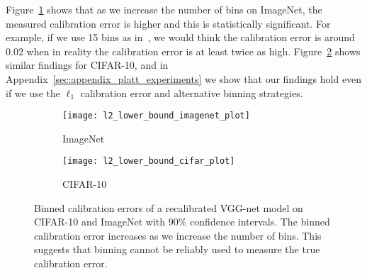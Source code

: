 Figure~\ref{fig:imagenet_lower_bound} shows that as we increase the number of bins on ImageNet, the measured calibration error is higher and this is statistically significant. For example, if we use 15 bins as in~\cite{guo2017calibration}, we would think the calibration error is around 0.02 when in reality the calibration error is at least twice as high. Figure~\ref{fig:cifar_10_lower_bound} shows similar findings for CIFAR-10, and in Appendix~\ref{sec:appendix_platt_experiments} we show that our findings hold even if we use the $\ell_1$ calibration error and alternative binning strategies.

\begin{figure}
     \centering
     \begin{subfigure}[b]{0.4\textwidth}
         \centering
         \texttt{[image: l2\_lower\_bound\_imagenet\_plot]}
         \caption{ImageNet}
         \label{fig:imagenet_lower_bound}
     \end{subfigure}
     \hfill
     \begin{subfigure}[b]{0.4\textwidth}
         \centering
         \texttt{[image: l2\_lower\_bound\_cifar\_plot]}
         \caption{CIFAR-10}
         \label{fig:cifar_10_lower_bound}
     \end{subfigure}
        \caption{
          Binned calibration errors of a recalibrated VGG-net model on CIFAR-10 and ImageNet  with $90\%$ confidence intervals. The binned calibration error increases as we increase the number of bins. This suggests that binning cannot be reliably used to measure the true calibration error.
        }
        \label{fig:lower_bounds}
\end{figure}





